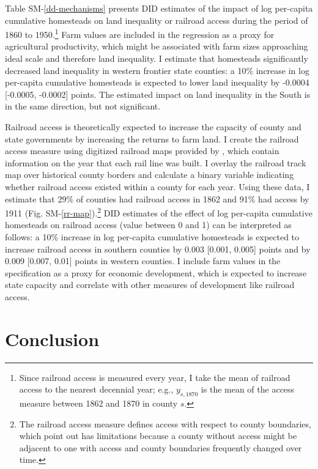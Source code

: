 \documentclass[12pt]{article}
\begin{document}
Table SM-\ref{dd-mechanisms} presents DID estimates of the impact of log per-capita cumulative homesteads on land inequality or railroad access during the period of 1860 to 1950.\footnote{Since railroad access is measured every year, I take the mean of railroad access to the nearest decennial year; e.g., $y_{s, 1870}$ is the mean of the access measure between 1862 and 1870 in county $s$.} Farm values are included in the regression as a proxy for agricultural productivity, which might be associated with farm sizes approaching ideal scale and therefore land inequality. I estimate that homesteads significantly decreased land inequality in western frontier state counties: a 10\% increase in log per-capita cumulative homesteads is expected to lower land inequality by -0.0004 [-0.0005, -0.0002] points. The estimated impact on land inequality in the South is in the same direction, but not significant. 

Railroad access is theoretically expected to increase the capacity of county and state governments by increasing the returns to farm land. I create the railroad access measure using digitized railroad maps provided by \citet{atack2013use}, which contain information on the year that each rail line was built. I overlay the railroad track map over historical county borders and calculate a binary variable indicating whether railroad access existed within a county for each year. Using these data, I estimate that 29\% of counties had railroad access in 1862 and 91\% had access by 1911 (Fig. SM-\ref{rr-map}).\footnote{The railroad access measure defines access with respect to county boundaries, which \citet{atack2012impact} point out has limitations because a county without access might be adjacent to one with access and county boundaries frequently changed over time.} DID estimates of the effect of log per-capita cumulative homesteads on railroad access (value between 0 and 1) can be interpreted as follows: a 10\% increase in log per-capita cumulative homesteads is expected to increase railroad access in southern counties by 0.003 [0.001, 0.005] points and by 0.009 [0.007, 0.01] points in western counties. I include farm values in the specification as a proxy for economic development, which is expected to increase state capacity and correlate with other measures of development like railroad access. 

\section{Conclusion} \label{discussion} 
\end{document}
